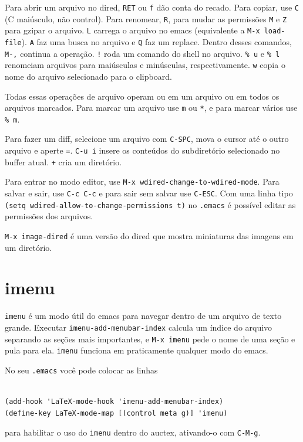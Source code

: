 \documentclass[12pt,brazil]{book}
\begin{document}
Para abrir um arquivo no dired, \texttt{RET} ou \texttt{f} dão conta
do recado. Para copiar, use \texttt{C} (C maiúsculo, não
control). Para renomear, \texttt{R}, para mudar as permissões
\texttt{M} e \texttt{Z} para gzipar o arquivo. \texttt{L} carrega o
arquivo no emacs (equivalente a \texttt{M-x load-file}). \texttt{A}
faz uma busca no arquivo e \texttt{Q} faz um replace. Dentro desses
comandos, \texttt{M-,} continua a operação. \texttt{!} roda um comando
do shell no arquivo. \texttt{\% u} e \texttt{\% l} renomeiam arquivos
para maiúsculas e minúsculas, respectivamente. \texttt{w} copia o nome
do arquivo selecionado para o clipboard.

Todas essas operações de arquivo operam ou em um arquivo ou em todos
os arquivos marcados. Para marcar um arquivo use \texttt{m} ou
\texttt{*}, e para marcar vários use \texttt{\% m}.

Para fazer um diff, selecione um arquivo com \texttt{C-SPC}, mova o
cursor até o outro arquivo e aperte \texttt{=}. \texttt{C-u i} insere
os conteúdos do subdiretório selecionado no buffer atual. \texttt{+}
cria um diretório.

Para entrar no modo editor, use \texttt{M-x
  wdired-change-to-wdired-mode}. Para salvar e sair, use \texttt{C-c
  C-c} e para sair sem salvar use \texttt{C-ESC}. Com uma linha tipo
\texttt{(setq wdired-allow-to-change-permissions t)} no
\texttt{.emacs} é possível editar as permissões dos arquivos.

\texttt{M-x image-dired} é uma versão do dired que mostra miniaturas
das imagens em um diretório.

\section{imenu}
\label{sec:imenu}

\texttt{imenu} é um modo útil do emacs para navegar dentro de um
arquivo de texto grande. Executar \texttt{imenu-add-menubar-index}
calcula um índice do arquivo separando as seções mais importantes, e
\texttt{M-x imenu} pede o nome de uma seção e pula para
ela. \texttt{imenu} funciona em praticamente qualquer modo do emacs.

No seu \texttt{.emacs} você pode colocar as linhas
\begin{verbatim}

(add-hook 'LaTeX-mode-hook 'imenu-add-menubar-index)
(define-key LaTeX-mode-map [(control meta g)] 'imenu)

\end{verbatim}
para habilitar o uso do \texttt{imenu} dentro do auctex, ativando-o
com \texttt{C-M-g}.
\end{document}
